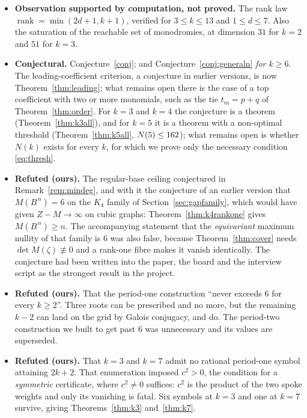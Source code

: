 \documentclass[11pt]{article}
\theoremstyle{definition}
\begin{document}
\begin{itemize}
\item \textbf{Observation supported by computation, not proved.} The rank law
$\operatorname{rank}=\min(2d+1,k+1)$, verified for $3\le k\le13$ and
$1\le d\le7$. Also the saturation of the reachable set of monodromies, at
dimension $31$ for $k=2$ and $51$ for $k=3$.

\item \textbf{Conjectural.} Conjecture~\ref{conj}; and
Conjecture~\ref{conj:generaln} \emph{for $k\ge6$}. The leading-coefficient
criterion, a conjecture in earlier versions, is now Theorem~\ref{thm:leading};
what remains open there is the case of a top coefficient with two or more
monomials, such as the tie $t_m=p+q$ of Theorem~\ref{thm:order}. For $k=3$ and $k=4$ the
conjecture is a theorem (Theorem~\ref{thm:k3all}), and for $k=5$ it is a theorem
with a non-optimal threshold (Theorem~\ref{thm:k5all}, $N(5)\le162$);
what remains open is whether $N(k)$ exists for every $k$, for which we prove only
the necessary condition \eqref{eq:thresh}.

\item \textbf{Refuted (ours).} The regular-base ceiling conjectured in
Remark~\ref{rem:mindeg}, and with it the conjecture of an earlier version that
$M(B^{\,n})=6$ on the $K_4$ family of Section~\ref{sec:gapfamily}, which would
have given $Z-M\to\infty$ on cubic graphs: Theorem~\ref{thm:k4rankone} gives
$M(B^{\,n})\ge n$. The accompanying statement that the \emph{equivariant}
maximum nullity of that family is $6$ was also false, because
Theorem~\ref{thm:cover} needs $\det M(\zeta)\not\equiv0$ and a rank-one fibre
makes it vanish identically. The conjecture had been written into the paper,
the board and the interview script as the strongest result in the project.

\item \textbf{Refuted (ours).} That the period-one construction ``never exceeds
$6$ for every $k\ge2$''. Three roots can be prescribed and no more, but the
remaining $k-2$ can land on the grid by Galois conjugacy, and do. The
period-two construction we built to get past $6$ was unnecessary and its values
are superseded.

\item \textbf{Refuted (ours).} That $k=3$ and $k=7$ admit no rational
period-one symbol attaining $2k+2$. That enumeration imposed $c^{2}>0$, the
condition for a \emph{symmetric} certificate, where $c^{2}\ne0$ suffices: $c^{2}$
is the product of the two spoke weights and only its vanishing is fatal. Six
symbols at $k=3$ and one at $k=7$ survive, giving Theorems~\ref{thm:k3}
and~\ref{thm:k7}.


\end{itemize}
\end{document}
